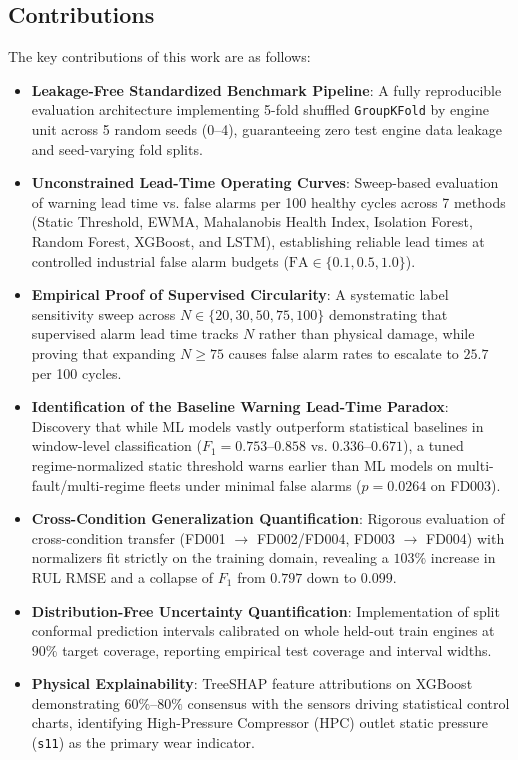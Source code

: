 \subsection{Contributions}
The key contributions of this work are as follows:
\begin{itemize}
    \item \textbf{Leakage-Free Standardized Benchmark Pipeline}: A fully reproducible evaluation architecture implementing 5-fold shuffled \texttt{GroupKFold} by engine unit across 5 random seeds (0--4), guaranteeing zero test engine data leakage and seed-varying fold splits.
    \item \textbf{Unconstrained Lead-Time Operating Curves}: Sweep-based evaluation of warning lead time vs. false alarms per 100 healthy cycles across 7 methods (Static Threshold, EWMA, Mahalanobis Health Index, Isolation Forest, Random Forest, XGBoost, and LSTM), establishing reliable lead times at controlled industrial false alarm budgets ($\text{FA} \in \{0.1, 0.5, 1.0\}$).
    \item \textbf{Empirical Proof of Supervised Circularity}: A systematic label sensitivity sweep across $N \in \{20, 30, 50, 75, 100\}$ demonstrating that supervised alarm lead time tracks $N$ rather than physical damage, while proving that expanding $N \ge 75$ causes false alarm rates to escalate to $25.7$ per 100 cycles.
    \item \textbf{Identification of the Baseline Warning Lead-Time Paradox}: Discovery that while ML models vastly outperform statistical baselines in window-level classification ($F_1 = 0.753$--$0.858$ vs. $0.336$--$0.671$), a tuned regime-normalized static threshold warns earlier than ML models on multi-fault/multi-regime fleets under minimal false alarms ($p = 0.0264$ on FD003).
    \item \textbf{Cross-Condition Generalization Quantification}: Rigorous evaluation of cross-condition transfer (FD001 $\to$ FD002/FD004, FD003 $\to$ FD004) with normalizers fit strictly on the training domain, revealing a $103\%$ increase in RUL RMSE and a collapse of $F_1$ from $0.797$ down to $0.099$.
    \item \textbf{Distribution-Free Uncertainty Quantification}: Implementation of split conformal prediction intervals calibrated on whole held-out train engines at $90\%$ target coverage, reporting empirical test coverage and interval widths.
    \item \textbf{Physical Explainability}: TreeSHAP feature attributions on XGBoost demonstrating $60\%$--$80\%$ consensus with the sensors driving statistical control charts, identifying High-Pressure Compressor (HPC) outlet static pressure (\texttt{s11}) as the primary wear indicator.
\end{itemize}


